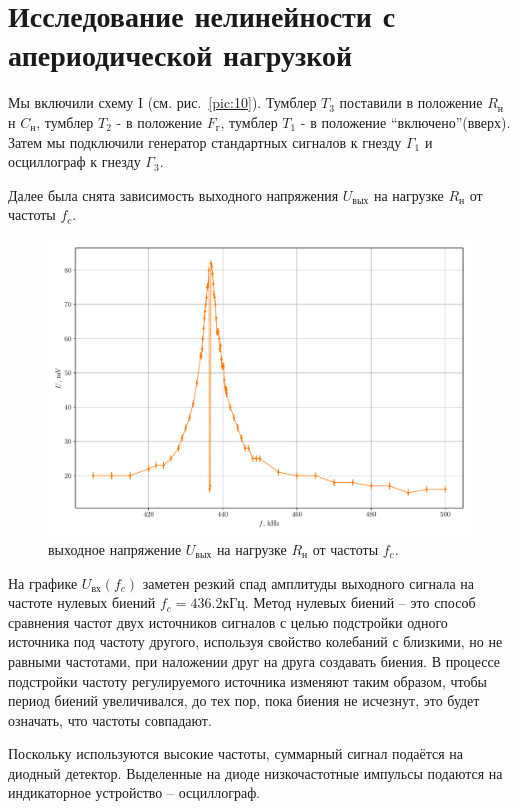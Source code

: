 \section[Задание 1]{Исследование нелинейности с апериодической нагрузкой}
Мы включили схему I (см. рис.~\ref{pic:10}). Тумблер $T_3$ поставили в положение $R_{\text{н}}$ н $C_{\text{н}}$,
тумблер $T_2$ - в положение $F_{\text{г}}$, тумблер $T_1$ - в положение “включено”(вверх). Затем мы
подключили генератор стандартных сигналов к гнезду $\Gamma_1$ и осциллограф к гнезду $\Gamma_3$.

Далее была снята зависимость выходного напряжения $U_{\text{вых}}$ на нагрузке $R_{\text{н}}$ от частоты $f_c$. 
\begin{figure}[h!]
	\centering
	\includegraphics[width=\textwidth]{plots/exp1.pdf}
	\caption{выходное напряжение $U_{\text{вых}}$ на нагрузке $R_{\text{н}}$ от частоты $f_c$.}
	\label{exp:1}
\end{figure}

На графике $U_\text{вх}(f_c)$ заметен резкий спад амплитуды выходного сигнала на частоте нулевых биений $f_c=436.2\text{кГц}$. Метод нулевых биений -- это способ сравнения частот двух источников сигналов с целью подстройки одного источника под частоту другого, используя свойство колебаний с близкими, но не равными частотами, при наложении друг на друга создавать биения. В процессе подстройки частоту регулируемого источника изменяют таким образом, чтобы период биений увеличивался, до тех пор, пока биения не исчезнут, это будет означать, что частоты совпадают. 

Поскольку используются высокие частоты, суммарный сигнал подаётся на диодный детектор. Выделенные на диоде низкочастотные импульсы подаются на индикаторное устройство -- осциллограф.

